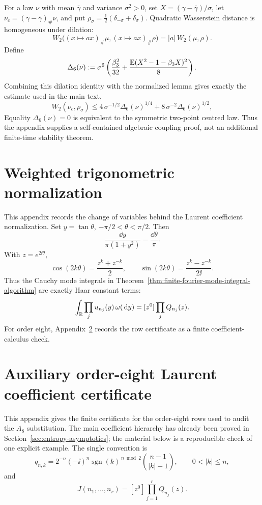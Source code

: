 For a law \(\nu\) with mean \(\bar\gamma\) and variance \(\sigma^2>0\), set
\(X=(\gamma-\bar\gamma)/\sigma\), let
\(\nu_c=(\gamma-\bar\gamma)_\#\nu\), and put
\(\rho_\sigma=\frac12(\delta_{-\sigma}+\delta_\sigma)\).  Quadratic
Wasserstein distance is homogeneous under dilation:
\[
W_2\bigl((x\mapsto ax)_\#\mu,(x\mapsto ax)_\#\rho\bigr)
=|a|\,W_2(\mu,\rho).
\]
Define
\[
\Delta_6(\nu)
:=\sigma^6\left(
\frac{\beta_3^2}{32}+\frac{\mathbb{E}(X^2-1-\beta_3X)^2}{8}
\right).
\]
Combining this dilation identity with the normalized lemma gives exactly the
estimate used in the main text,
\[
W_2(\nu_c,\rho_\sigma)
\le
4\,\sigma^{-1/2}\Delta_6(\nu)^{1/4}
+8\,\sigma^{-2}\Delta_6(\nu)^{1/2},
\]
Equality \(\Delta_6(\nu)=0\) is equivalent to the symmetric two-point centred
law.  Thus the appendix supplies a self-contained algebraic coupling proof,
not an additional finite-time stability theorem.

\section{Weighted trigonometric normalization}%
\label{app:entropy-integrals}

This appendix records the change of variables behind the Laurent coefficient
normalization.  Set \(y=\tan\theta\),
\(-\pi/2<\theta<\pi/2\).  Then
\[
  \frac{\dd y}{\pi(1+y^2)}=\frac{\dd\theta}{\pi}.
\]
With \(z=e^{2\ii\theta}\),
\[
  \cos(2k\theta)=\frac{z^k+z^{-k}}2,\qquad
  \sin(2k\theta)=\frac{z^k-z^{-k}}{2\ii}.
\]
Thus the Cauchy mode integrals in
Theorem~\ref{thm:finite-fourier-mode-integral-algorithm} are exactly Haar
constant terms:
\[
  \int_{\mathbb{R}}\prod_j u_{n_j}(y)\,\omega(\,\mathrm{d} y)
  =[z^0]\prod_j Q_{n_j}(z).
\]
For order eight, Appendix~\ref{app:order-eight-laurent-certificate} records
the row certificate as a finite coefficient-calculus check.

\section{Auxiliary order-eight Laurent coefficient certificate}%
\label{app:order-eight-laurent-certificate}

This appendix gives the finite certificate for the order-eight rows used to
audit the \(A_8\) substitution.  The main coefficient hierarchy has already
been proved in Section~\ref{sec:entropy-asymptotics}; the material below is
a reproducible check of one explicit example.  The single convention is
\[
q_{n,k}=2^{-n}(-\ii)^n
\operatorname{sgn}(k)^{\,n\bmod2}
\binom{n-1}{|k|-1},
\qquad 0<|k|\le n,
\]
and
\[
J(n_1,\ldots,n_r)=[z^0]\prod_{j=1}^rQ_{n_j}(z).
\]

